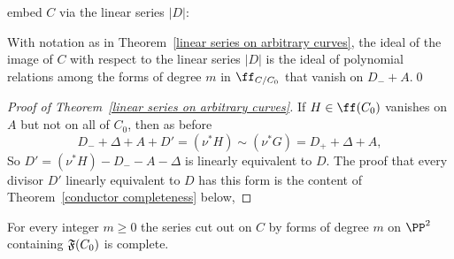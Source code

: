 embed $C$ via the linear series
$|D|$:

\begin{corollary}
With notation as in Theorem~\ref{linear series on arbitrary curves},
the ideal of the image of
$C$ with respect to the linear series $|D|$ is the ideal of polynomial
relations among the forms
of degree $m$ in $\ff_{C/C_{0}}$ that vanish on $D_{-}+A$.\qed
\unif
\end{corollary}

\begin{proof}[Proof of Theorem~\ref{linear series on arbitrary curves}]
If $H\in \ff(C_{0})$ vanishes on $A$ but not on all of $C_{0}$, then
as before
$$
 D_{-} +\Delta + A+ D' = (\nu^*H) \sim (\nu^*G) = D_{+} + \Delta + A,
$$
So $D' = (\nu^*{H})-D_{-}-A-\Delta$ is linearly equivalent to $D$. The
proof that every
divisor $D'$ linearly equivalent to $D$ has this form is the content of
Theorem~\ref{conductor completeness} below,
%
\end{proof}

\begin{theorem}\label{conductor completeness}
For every integer $m\geq 0$ the series cut out on $C$ by forms of
degree $m$
on $\PP^{2}$ containing $\adj(C_{0})$ is complete.
\end{theorem}

